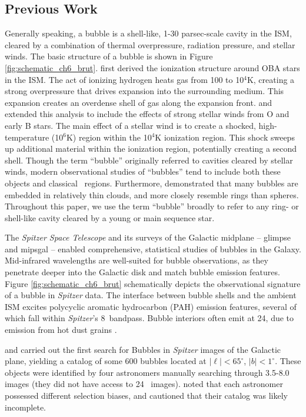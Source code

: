 \subsection{Previous Work}
\label{sec:previous}

Generally speaking, a bubble is a shell-like, 1-30 parsec-scale cavity in the ISM, cleared by a combination of thermal overpressure, radiation pressure, and stellar winds. The basic structure of a bubble is shown in Figure \ref{fig:schematic_ch6_brut}. \cite{Stromgren39} first derived the ionization structure around OBA stars in the ISM. The act of ionizing hydrogen heats gas from 100 to 10$^4$K, creating a strong overpressure that drives expansion into the surrounding medium. This expansion creates an overdense shell of gas along the expansion front. \cite{Castor75} and \cite{Weaver77} extended this analysis to include the effects of strong stellar winds from O and early B stars. The main effect of a stellar wind is to create a shocked, high-temperature (10$^6$K) region within the 10$^4$K ionization region. This shock sweeps up additional material within the ionization region, potentially creating a second shell. Though the term ``bubble'' originally referred to cavities cleared by stellar winds, modern observational studies of ``bubbles'' tend to include both these objects and classical \hii\, regions. Furthermore, \cite{Beaumont10} demonstrated that many bubbles are embedded in relatively thin clouds, and more closely resemble rings than spheres. Throughout this paper, we use the term ``bubble'' broadly to refer to any ring- or shell-like cavity cleared by a young or main sequence star.

The \emph{Spitzer Space Telescope} and its surveys of the Galactic midplane -- {\sc glimpse} \citep{Benjamin03} and {\sc mipsgal} \citep{Carey09} -- enabled comprehensive, statistical studies of bubbles in the Galaxy. Mid-infrared wavelengths are well-suited for bubble observations, as they penetrate deeper into the Galactic disk and match bubble emission features. Figure \ref{fig:schematic_ch6_brut} schematically depicts the observational signature of a bubble in \emph{Spitzer} data. The interface between bubble shells and the ambient ISM excites polycyclic aromatic hydrocarbon (PAH) emission features, several of which fall within \emph{Spitzer}'s 8\um\, bandpass. Bubble interiors often emit at 24\um, due to emission from hot dust grains \citep{Everett10}.

\cite{Churchwell06} and \cite{Churchwell07} carried out the first search for Bubbles in \emph{Spitzer} images of the Galactic plane, yielding  a catalog of some 600 bubbles located at $|\ell| < 65^\circ$, $|b| < 1^\circ$. These objects were identified by four astronomers manually searching through 3.5-8.0 \um\, images (they did not have access to 24 \um\, images). \cite{Churchwell06} noted that each astronomer possessed different selection biases, and cautioned that their catalog was likely incomplete.

